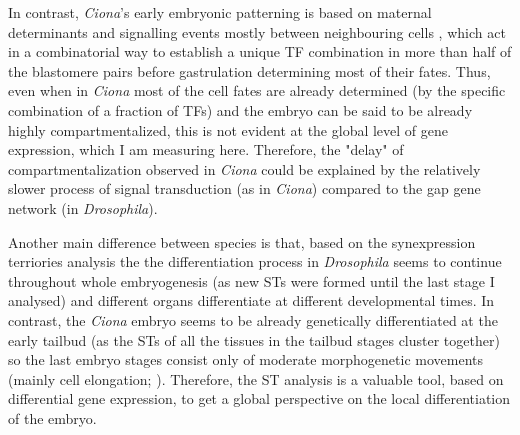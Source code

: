 In contrast,  \textit{Ciona}'s early embryonic patterning is based on maternal determinants and signalling events mostly between neighbouring cells \citep{Lemaire2009}, which act in a combinatorial way \citep{Hudson2007} to establish a unique TF combination in more than half of the blastomere pairs before gastrulation \citep{Imai2006} determining most of their fates.
Thus, even when in \textit{Ciona} most of the cell fates are already determined (by the specific combination of a fraction of TFs) and the embryo can be said to be already highly compartmentalized, this is not evident at the global level of gene expression, which I am measuring here.
Therefore, the "delay" of compartmentalization observed in \textit{Ciona} could be explained by the relatively slower process of signal transduction (as in \textit{Ciona}) compared to the gap gene network (in \textit{Drosophila}).

Another main difference between species is that, based on the synexpression terriories analysis the the differentiation process in \textit{Drosophila} seems to continue throughout whole embryogenesis (as new STs were formed until the last stage I analysed) and different organs differentiate at different developmental times.
In contrast, the \textit{Ciona} embryo seems to be already genetically differentiated at the early tailbud (as the STs of all the tissues in the tailbud stages cluster together) so the last embryo stages consist only of moderate morphogenetic movements (mainly cell elongation; \citealp{Hotta2007}).
Therefore, the ST analysis is a valuable tool, based on differential gene expression, to get a global perspective on the local differentiation of the embryo.